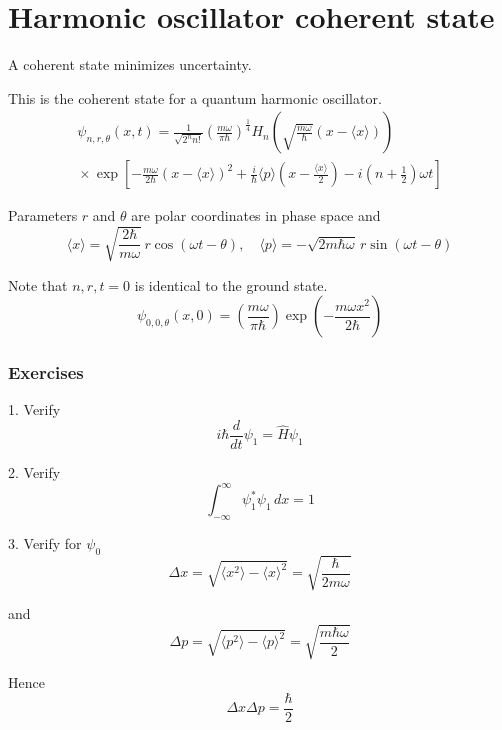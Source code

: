 

\section*{Harmonic oscillator coherent state}

A coherent state minimizes uncertainty.

\bigskip
This is the coherent state for a quantum harmonic oscillator.
\begin{multline*}
\psi_{n,r,\theta}(x,t)
=\frac{1}{\sqrt{2^nn!}}
\left(\frac{m\omega}{\pi\hbar}\right)^\frac{1}{4}
H_n\left(\sqrt{\frac{m\omega}{\hbar}}\left(x-\langle x\rangle\right)\right)
\\{}\times
\exp\left[
-\frac{m\omega}{2\hbar}\left(x-\langle x\rangle\right)^2
+\frac{i}{\hbar}\langle p\rangle\left(x-\frac{\langle x\rangle}{2}\right)
-i\left(n+\frac{1}{2}\right)\omega t
\right]
\end{multline*}

Parameters $r$ and $\theta$ are polar coordinates in phase space and
\begin{equation*}
\langle x\rangle=\sqrt{\frac{2\hbar}{m\omega}}\,r\cos(\omega t-\theta),\quad
\langle p\rangle=-\sqrt{2m\hbar\omega}\,r\sin(\omega t-\theta)
\end{equation*}

Note that $n,r,t=0$ is identical to the ground state.
\begin{equation*}
\psi_{0,0,\theta}(x,0)=\left(\frac{m\omega}{\pi\hbar}\right)
\exp\left(-\frac{m\omega x^2}{2\hbar}\right)
\end{equation*}

\subsubsection*{Exercises}

1. Verify
\begin{equation*}
i\hbar\frac{d}{dt}\psi_1=\hat H\psi_1
\end{equation*}

2. Verify
\begin{equation*}
\int_{-\infty}^\infty\psi_1^*\psi_1\,dx=1
\end{equation*}

3. Verify for $\psi_0$
\begin{equation*}
\Delta x=\sqrt{\langle x^2\rangle-\langle x\rangle^2}
=\sqrt{\frac{\hbar}{2m\omega}}
\end{equation*}

and
\begin{equation*}
\Delta p=\sqrt{\langle p^2\rangle-\langle p\rangle^2}
=\sqrt{\frac{m\hbar\omega}{2}}
\end{equation*}

Hence
\begin{equation*}
\Delta x\Delta p=\frac{\hbar}{2}
\end{equation*}


